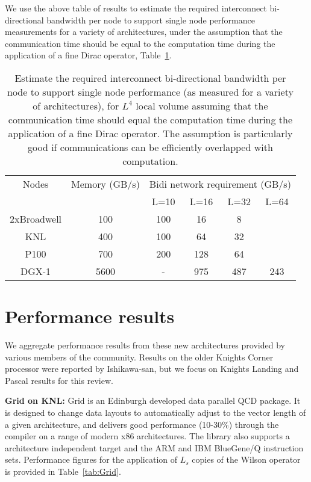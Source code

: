 \documentclass{PoS}
\begin{document}
\label{sec:netreq}
We use the above table of results to estimate the required interconnect bi-directional bandwidth per node to support
single node performance measurements for a variety of architectures, under the assumption that the communication time
should be equal to the computation time during the application of a fine Dirac operator, Table~\ref{tab:netreq}.
%
%
\begin{table}[hbt]
\begin{tabular}{|c|c|c|c|c|c|}
\hline
Nodes      & Memory (GB/s) & \multicolumn{4}{|c|}{Bidi network requirement (GB/s)}\\
           &         & L=10    & L=16 & L=32 & L=64 \\
\hline
2xBroadwell& 100 & 100 & 16 & 8 &\\ 
KNL        & 400 & 100 & 64 & 32&\\
P100       & 700 & 200 & 128 & 64&\\
DGX-1      & 5600& - & 975 & 487 & 243\\
\hline
\end{tabular}
\caption{\label{tab:netreq}
Estimate the required interconnect bi-directional bandwidth per node to support 
single node performance (as measured for a variety of architectures), for $L^4$ local volume 
assuming that the communication time should equal the computation time during the application of a fine Dirac operator. 
The assumption is particularly good if communications
can be efficiently overlapped with computation.
}
\end{table}

\section{Performance results}

We aggregate performance results from these new architectures provided by various members of the community.
Results on the older Knights Corner processor were reported by  Ishikawa-san\cite{ishikawa}, but we
focus on Knights Landing and Pascal results for this review.

{\bf Grid on KNL:}
Grid is an Edinburgh developed data parallel QCD package\cite{grid}.
It is designed to change data layouts to automatically adjust to the vector length 
of a given architecture, and delivers good performance (10-30\%) through the compiler
on a range of modern x86 architectures. The library also supports a architecture independent
target and the ARM and IBM BlueGene/Q instruction sets. Performance figures for 
the application of $L_s$ copies of the Wilson operator is provided in Table~\ref{tab:Grid}.
\end{document}
